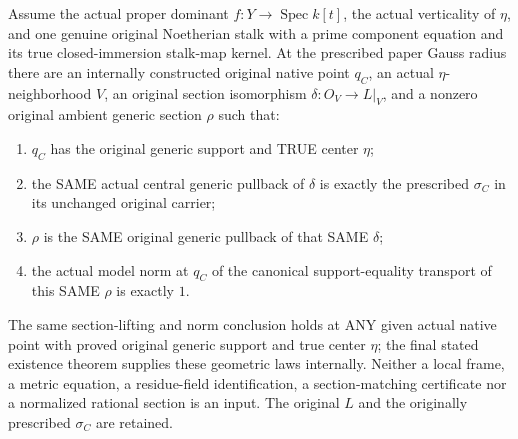 \begin{theorem}
\label{thm:gauss-central-line-prescribed-section-unit-norm}
\leanok
Assume the actual proper dominant $f:Y\to\operatorname{Spec}k[t]$, the
actual verticality of $\eta$, and one genuine original Noetherian stalk
with a prime component equation and its true closed-immersion stalk-map
kernel. At the prescribed paper Gauss radius there are an internally
constructed original native point $q_C$, an actual $\eta$-neighborhood
$V$, an original section isomorphism $\delta:O_V\to L|_V$, and a nonzero
original ambient generic section $\rho$ such that:
\begin{enumerate}
\item $q_C$ has the original generic support and TRUE center $\eta$;
\item the SAME actual central generic pullback of $\delta$ is exactly
  the prescribed $\sigma_C$ in its unchanged original carrier;
\item $\rho$ is the SAME original generic pullback of that SAME $\delta$;
\item the actual model norm at $q_C$ of the canonical support-equality
  transport of this SAME $\rho$ is exactly $1$.
\end{enumerate}
The same section-lifting and norm conclusion holds at ANY given actual
native point with proved original generic support and true center $\eta$;
the final stated existence theorem supplies these geometric laws internally.
Neither a local frame, a metric equation, a residue-field identification,
a section-matching certificate nor a normalized rational section is an
input. The original $L$ and the originally prescribed $\sigma_C$ are retained.
\end{theorem}
